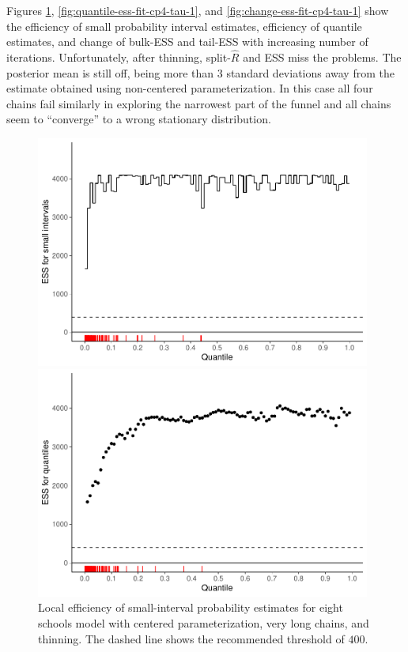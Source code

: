 \documentclass[american,]{article}
\theoremstyle{definition}
\begin{document}
Figures \ref{fig:local-ess-fit-cp4-tau-1},
\ref{fig:quantile-ess-fit-cp4-tau-1}, and
\ref{fig:change-ess-fit-cp4-tau-1} show the efficiency of small
probability interval estimates, efficiency of quantile estimates, and
change of bulk-ESS and tail-ESS with increasing number of iterations.
Unfortunately, after thinning, split-\(\widehat{R}\) and ESS
miss the problems. The posterior mean is still off,
being more than 3 standard deviations away from the estimate obtained using
non-centered parameterization. In this case all four chains fail
similarly in exploring the narrowest part of the funnel and all
chains seem to ``converge'' to a wrong stationary distribution.
\begin{figure}[tp]
  \centering
  \begin{minipage}{0.48\textwidth}
  \includegraphics[width=0.98\textwidth]{graphics/local-ess-fit-cp4-tau-1.pdf}
  \caption{Local efficiency of small-interval probability estimates for eight
  schools model with centered parameterization, very long chains, and thinning. The dashed line shows the
    recommended threshold of $400$.}
  \label{fig:local-ess-fit-cp4-tau-1}
\end{minipage}
\hfill
  \begin{minipage}{0.48\textwidth}
  \includegraphics[width=0.98\textwidth]{graphics/quantile-ess-fit-cp4-tau-1.pdf}

\end{minipage}
\end{figure}
\end{document}
